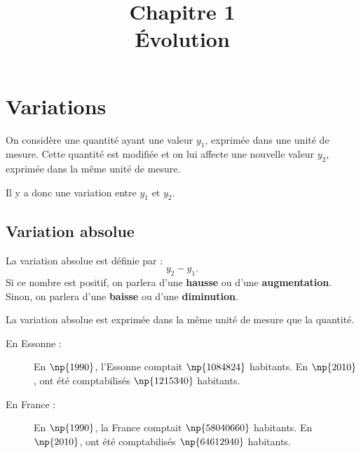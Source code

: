 \documentclass[xcolor={dvipsnames,svgnames,table}]{beamer}
\title[\'Evolution]{{\small Chapitre 1}\\ \textbf{\'Evolution}}
\date{}
\author{}
\begin{document}
\begin{frame}
\titlepage
\end{frame}

\section{Variations}

\begin{frame}
On considère une quantité ayant une valeur $y_1$, exprimée dans une unité de mesure. Cette quantité est modifiée et on lui affecte une nouvelle valeur $y_2$, exprimée dans la même unité de mesure.\par
Il y a donc une variation entre $y_1$ et $y_2$.
\end{frame}

\subsection{Variation absolue}

\begin{frame}
    \begin{Definition}
        La \alert{variation absolue} est définie par : \[y_2 - y_1.\]
        Si ce nombre est positif, on parlera d'une \textbf{hausse} ou d'une \textbf{augmentation}. Sinon, on parlera d'une \textbf{baisse} ou d'une \textbf{diminution}.
    \end{Definition}\pause

    \begin{Rmq}
       La variation absolue est exprimée dans la même unité de mesure que la quantité.
    \end{Rmq}
\end{frame}

\begin{frame}
    \begin{Examples}
        \begin{description}
            \item[En Essonne :] En $\np{1990}$, l'Essonne comptait $\np{1084824}$ habitants. En $\np{2010}$, ont été comptabilisés $\np{1215340}$ habitants.\par
            \item[En France :] En $\np{1990}$, la France comptait $\np{58 040 660}$ habitants. En $\np{2010}$, ont été comptabilisés $\np{64 612 940}$ habitants.\par
        \end{description}
    \end{Examples}
\end{frame}
\end{document}
